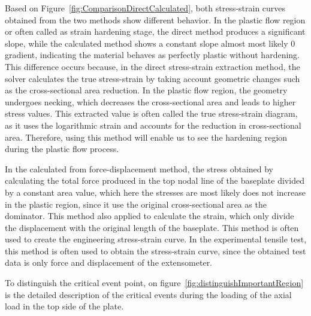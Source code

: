 \documentclass[12pt]{article}
\begin{document}
\hspace{2em}Based on Figure~\ref{fig:ComparisonDirectCalculated}, both stress-strain curves obtained from the two 
methods show different behavior. In the plastic flow region or often called as strain hardening stage, 
the direct method produces a significant slope, while the calculated method shows a constant slope almost most likely 0 gradient, 
indicating the material behaves as perfectly plastic without hardening. 
This difference occurs because, in the direct stress-strain extraction method, the solver calculates the true stress-strain 
by taking account geometric changes such as the cross-sectional area reduction. In the plastic flow
region, the geometry undergoes necking, which decreases the cross-sectional area and leads to higher 
stress values. This extracted value is often called the true stress-strain diagram, as it uses the logarithmic 
strain and accounts for the reduction in cross-sectional area. Therefore, using this method will enable us to see the hardening
region during the plastic flow process.

\hspace{2em}In the calculated from force-displacement method, the stress obtained by calculating the total force produced in the top nodal line of the baseplate divided by a constant area value, which here
the stresses are most likely does not increase in the plastic region, since it use the original cross-sectional area as the dominator. This method also applied to calculate the strain, which only
divide the displacement with the original length of the baseplate. This method is often used to create the engineering stress-strain curve. In the experimental tensile test, 
this method is often used to obtain the stress-strain curve, 
since the obtained test data is only force and displacement of the extensometer. 

\hspace{2em}To distinguish the critical event point, on figure~\ref{fig:distinguishImportantRegion} is the detailed description of the critical
events during the loading of the axial load in the top side of the plate. 
\end{document}
